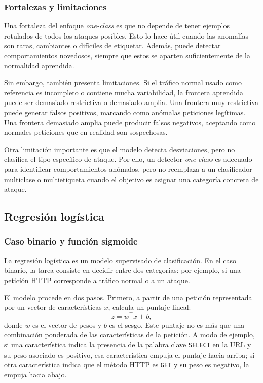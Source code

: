 \documentclass[12pt,oneside]{report}
\begin{document}
\subsubsection{Fortalezas y limitaciones}

Una fortaleza del enfoque \textit{one-class} es que no depende de tener ejemplos rotulados de todos los ataques posibles. Esto lo hace útil cuando las anomalías son raras, cambiantes o difíciles de etiquetar. Además, puede detectar comportamientos novedosos, siempre que estos se aparten suficientemente de la normalidad aprendida.

Sin embargo, también presenta limitaciones. Si el tráfico normal usado como referencia es incompleto o contiene mucha variabilidad, la frontera aprendida puede ser demasiado restrictiva o demasiado amplia. Una frontera muy restrictiva puede generar falsos positivos, marcando como anómalas peticiones legítimas. Una frontera demasiado amplia puede producir falsos negativos, aceptando como normales peticiones que en realidad son sospechosas.

Otra limitación importante es que el modelo detecta desviaciones, pero no clasifica el tipo específico de ataque. Por ello, un detector \textit{one-class} es adecuado para identificar comportamientos anómalos, pero no reemplaza a un clasificador multiclase o multietiqueta cuando el objetivo es asignar una categoría concreta de ataque.

\subsection{Regresión logística}

\subsubsection{Caso binario y función sigmoide}

La regresión logística es un modelo supervisado de clasificación. En el caso
binario, la tarea consiste en decidir entre dos categorías: por ejemplo,
si una petición HTTP corresponde a tráfico normal o a un ataque.

El modelo procede en dos pasos. Primero, a partir de una petición
representada por un vector de características $x$, calcula un puntaje lineal:
\[
z=w^\top x+b,
\]
donde $w$ es el vector de pesos y $b$ es el sesgo. Este puntaje no es más
que una combinación ponderada de las características de la petición. A modo
de ejemplo, si una característica indica la presencia de la palabra clave
\texttt{SELECT} en la URL y su peso asociado es positivo, esa característica
empuja el puntaje hacia arriba; si otra característica indica que el método
HTTP es \texttt{GET} y su peso es negativo, la empuja hacia abajo.
\end{document}
